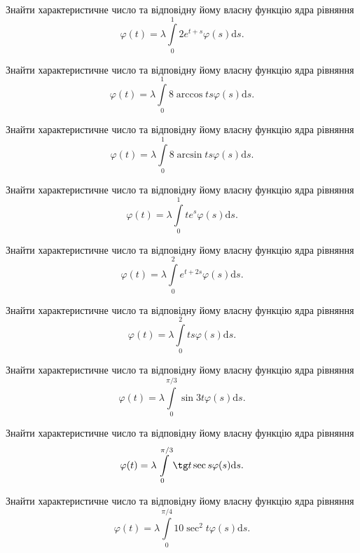 \documentclass[12pt]{extarticle}
\begin{document}
\begin{Exercise}
Знайти характеристичне число та відповідну йому власну функцію ядра рівняння \[\varphi(t) = \lambda\int\limits_{0}^{1} 2e^{t+s} \varphi(s) \mathrm{d}s.\]
\end{Exercise}

\begin{Exercise}
Знайти характеристичне число та відповідну йому власну функцію ядра рівняння \[\varphi(t) = \lambda\int\limits_{0}^{1} 8 \arccos t s \varphi(s) \mathrm{d}s.\]
\end{Exercise}

\begin{Exercise}
Знайти характеристичне число та відповідну йому власну функцію ядра рівняння \[\varphi(t) = \lambda\int\limits_{0}^{1} 8 \arcsin t s \varphi(s) \mathrm{d}s.\]
\end{Exercise}

\begin{Exercise}
Знайти характеристичне число та відповідну йому власну функцію ядра рівняння \[\varphi(t) = \lambda\int\limits_{0}^{1} t e^s \varphi(s) \mathrm{d}s.\]
\end{Exercise}

\begin{Exercise}
Знайти характеристичне число та відповідну йому власну функцію ядра рівняння \[\varphi(t) = \lambda\int\limits_{0}^{2} e^{t+2s} \varphi(s) \mathrm{d}s.\]
\end{Exercise}

\begin{Exercise}
Знайти характеристичне число та відповідну йому власну функцію ядра рівняння \[\varphi(t) = \lambda\int\limits_{0}^{2} ts \varphi(s) \mathrm{d}s.\]
\end{Exercise}

\begin{Exercise}
Знайти характеристичне число та відповідну йому власну функцію ядра рівняння \[\varphi(t) = \lambda\int\limits_{0}^{\pi/3} \sin 3t \varphi(s) \mathrm{d}s.\]
\end{Exercise}

\begin{Exercise}
Знайти характеристичне число та відповідну йому власну функцію ядра рівняння \[\varphi(t) = \lambda\int\limits_{0}^{\pi/3} \tg t \sec s \varphi(s) \mathrm{d}s.\]
\end{Exercise}

\begin{Exercise}
Знайти характеристичне число та відповідну йому власну функцію ядра рівняння \[\varphi(t) = \lambda\int\limits_{0}^{\pi/4} 10\sec^2 t \varphi(s) \mathrm{d}s.\]
\end{Exercise}
\end{document}

